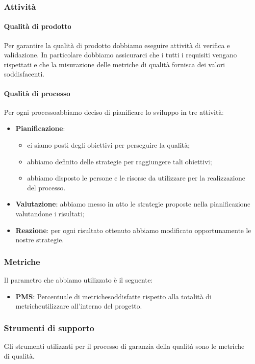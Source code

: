 \subsubsection{Attività} %
	\paragraph{Qualità di prodotto}
	Per garantire la qualità di prodotto dobbiamo eseguire attività di verifica e validazione. In particolare dobbiamo assicurarci che i tutti i requisiti vengano rispettati e che la misurazione delle metriche di qualità fornisca dei valori soddisfacenti.
	\paragraph{Qualità di processo}
Per ogni processo\glosp abbiamo deciso di pianificare lo sviluppo in tre attività:
\begin{itemize}
	\item \textbf{Pianificazione}:
		\begin{itemize}
			\item ci siamo posti degli obiettivi per perseguire la qualità;
			\item abbiamo definito delle strategie per raggiungere tali obiettivi;
			\item abbiamo disposto le persone e le risorse da utilizzare per la realizzazione del processo\glo.
		\end{itemize}
	\item \textbf{Valutazione}: abbiamo messo in atto le strategie proposte nella pianificazione valutandone i risultati;
	\item \textbf{Reazione}: per ogni risultato ottenuto abbiamo modificato opportunamente le nostre strategie.
\end{itemize}
\subsubsection{Metriche} %
Il parametro che abbiamo utilizzato è il seguente:
	\begin{itemize}
		\item \textbf{PMS}: Percentuale di metriche\glosp soddisfatte rispetto alla totalità di metriche\glosp utilizzare all'interno del progetto\glo.
	\end{itemize}
\subsubsection{Strumenti di supporto}
Gli strumenti utilizzati per il processo di garanzia della qualità sono le metriche di qualità.
